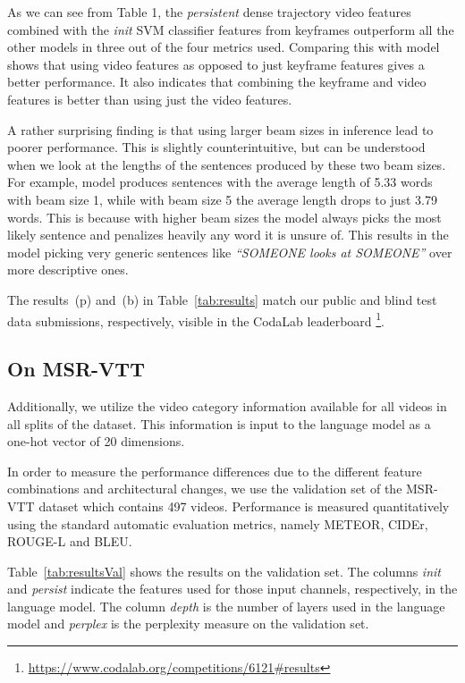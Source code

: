 As we can see from Table 1, the \emph{persistent} dense trajectory video
features combined with the \emph{init} SVM classifier features from keyframes
outperform all the other models in three out of the four metrics used.
Comparing this with model  shows that using video features as
opposed to just keyframe features gives a better performance.
It also indicates that combining the keyframe and video features is better than
using just the video features.

A rather surprising finding is that using larger beam sizes in inference lead to
poorer performance.
This is slightly counterintuitive, but can be understood when we look at the
lengths of the sentences produced by these two beam sizes. 
For example, model  produces sentences with the average length
of 5.33 words with beam size 1, while with beam size 5 the average length drops
to just 3.79 words. This is because with higher beam sizes the model always
picks the most likely sentence and penalizes heavily any word it is unsure of.
This results in the model picking very generic sentences like \emph{``SOMEONE
looks at SOMEONE''} over more descriptive ones.

The results~(p) and~(b) in Table~\ref{tab:results} match our public and blind
test data submissions, respectively, visible in the CodaLab leaderboard%
\footnote{\scriptsize\url{https://www.codalab.org/competitions/6121\#results}}.

\subsection{On MSR-VTT}
Additionally, we utilize the video category information available for all videos
in all splits of the dataset.
This information is input to the language model as a one-hot vector of 20
dimensions.

In order to measure the performance differences due to the different feature
combinations and architectural changes, we use the validation set of the MSR-VTT
dataset which contains 497 videos.
Performance is measured quantitatively using the standard automatic evaluation
metrics, namely METEOR, CIDEr, ROUGE-L and BLEU. 

Table~\ref{tab:resultsVal} shows the results on the validation set.
The columns \emph{init} and \emph{persist} indicate the features used for those
input channels, respectively, in the language model.
The column \emph{depth} is the number of layers used in the language model and
\emph{perplex} is the perplexity measure on the validation set.

